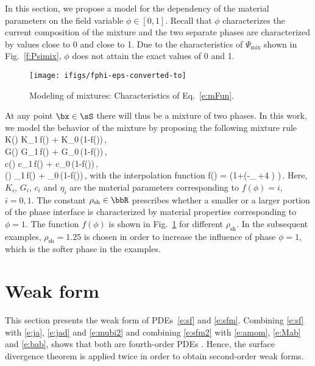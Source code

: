 \documentclass[11pt]{article}
\begin{document}
In this section, we propose a model for the dependency of the material parameters on the field variable $\phi \in [0,1]$. Recall that $\phi$ characterizes the current composition of the mixture and the two separate phases are characterized by values close to 0 and close to 1. Due to the characteristics of $\Psi_\mathrm{mix}$ shown in Fig.~\ref{f:Psimix}, $\phi$ does not attain the exact values of 0 and 1. 
\begin{figure}[h]
	\centering
	\texttt{[image: ifigs/fphi-eps-converted-to]}
	\caption{Modeling of mixtures: Characteristics of Eq.~\eqref{e:mFun}.}
	\label{fig:fphi}
\end{figure}
At any point $\bx\in\sS$ there will thus be a mixture of two phases. In this work, we model the behavior of the mixture by proposing the following mixture rule
K(\phi) \is K_1\,f(\phi) + K_0\,(1-f(\phi))\,, \\[1mm]
G(\phi) \is G_1\,f(\phi) + G_0\,(1-f(\phi))\,, \\[1mm]
c(\phi) \is c_1\,f(\phi) + c_0\,(1-f(\phi))\,, \\[1mm]
\eta(\phi) \is \eta_1\,f(\phi) + \eta_0\,(1-f(\phi))\,,
\label{e:mix}
\eqe
with the interpolation function
f(\phi) = \ds {}\Big(1+\left(-\rho_\,\pi +4\,\pi\,\phi \right) \Big)\,.
\label{e:mFun}
\eqe
Here, $K_i$, $G_i$, $c_i$ and $\eta_i$ are the material parameters corresponding to $f(\phi) = i$, $i=0,1$.
The constant $\rho_\mathrm{sh}\in\bbR$ prescribes whether a smaller or a larger portion of the phase interface is characterized by material properties corresponding to $\phi=1$.
The function $f(\phi)$ is shown in Fig.~\ref{fig:fphi} for different $\rho_\mathrm{sh}$. 
In the subsequent examples, $\rho_\mathrm{sh}=1.25$ is chosen in order to increase the influence of phase $\phi=1$, which is the softer phase in the examples. 

\section{Weak form}\label{s:wf}

This section presents the weak form of PDEs~\eqref{e:sf} and \eqref{e:sfm}.
Combining \eqref{e:sf} with \eqref{e:ja}, \eqref{e:jad} and \eqref{e:mubi2} and combining \eqref{e:sfm2} with \eqref{e:amom}, \eqref{e:Mab} and \eqref{e:bab},
shows that both are fourth-order PDEs \citep{sahu17}.
Hence, the surface divergence theorem is applied twice in order to obtain second-order weak forms.
\end{document}
